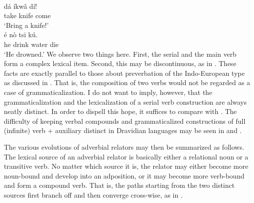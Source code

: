 \ea\label{ex:E90}
\\
\gll dá  íkwâ  dí!  \\
 take  knife  come  \\
 \glt ‘Bring a knife!’   
\z
\noindent \ea\label{ex:E91}
 \\
\gll é  nò  ts\=i  kú.  \\
he  drink  water  die \\
\glt  ‘He drowned.’
\z
\noindent We observe two things here. First, the serial and the main verb form a complex lexical item. Second, this may be discontinuous, as in . These facts are exactly parallel to those about preverbation of the Indo-European type as discussed in . That is, the composition of two verbs would not be regarded as a case of grammaticalization. I do not want to imply, however, that the grammaticalization and the lexicalization of a serial verb construction are always neatly distinct. In order to dispell this hope, it suffices to compare  with . The difficulty of keeping verbal compounds and grammaticalized constructions of full (infinite) verb + auxiliary distinct in Dravidian languages may be seen in \citet[90--96, 109--112]{Bloch1954} and \citet{Kachru1980}.

The various evolutions of adverbial relators may then be summarized as follows. The lexical source of an adverbial relator is basically either a relational noun or a transitive verb. No matter which source it is, the relator may either become more noun-bound and develop into an adposition, or it may become more verb-bound and form a compound verb. That is, the paths starting from the two distinct sources first branch off and then converge cross-wise, as in .

